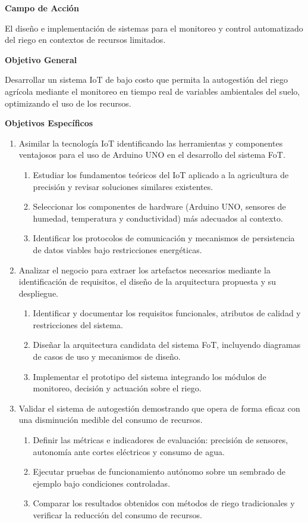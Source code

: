 \bigskip
\noindent\textbf{Campo de Acción}

\noindent El diseño e implementación de sistemas para el monitoreo y control automatizado del riego en contextos de recursos limitados.

\bigskip
\noindent\textbf{Objetivo General}

\noindent Desarrollar un sistema IoT de bajo costo que permita la autogestión del riego agrícola mediante el monitoreo en tiempo real de variables ambientales del suelo, optimizando el uso de los recursos.

\bigskip
\noindent\textbf{Objetivos Específicos}

\begin{enumerate}
	\item Asimilar la tecnología IoT identificando las herramientas y componentes 
	ventajosos para el uso de Arduino UNO en el desarrollo del sistema FoT.
	\begin{enumerate}
		\item Estudiar los fundamentos teóricos del IoT aplicado a la agricultura 
		de precisión y revisar soluciones similares existentes.
		\item Seleccionar los componentes de hardware (Arduino UNO, sensores de 
		humedad, temperatura y conductividad) más adecuados al contexto.
		\item Identificar los protocolos de comunicación y mecanismos de 
		persistencia de datos viables bajo restricciones energéticas.
	\end{enumerate}
	
	\item Analizar el negocio para extraer los artefactos necesarios mediante la 
	identificación de requisitos, el diseño de la arquitectura propuesta y su despliegue.
	\begin{enumerate}
		\item Identificar y documentar los requisitos funcionales, atributos de 
		calidad y restricciones del sistema.
		\item Diseñar la arquitectura candidata del sistema FoT, incluyendo 
		diagramas de casos de uso y mecanismos de diseño.
		\item Implementar el prototipo del sistema integrando los módulos de 
		monitoreo, decisión y actuación sobre el riego.
	\end{enumerate}
	
	\item Validar el sistema de autogestión demostrando que opera de forma eficaz 
	con una disminución medible del consumo de recursos.
	\begin{enumerate}
		\item Definir las métricas e indicadores de evaluación: precisión de 
		sensores, autonomía ante cortes eléctricos y consumo de agua.
		\item Ejecutar pruebas de funcionamiento autónomo sobre un sembrado de 
		ejemplo bajo condiciones controladas.
		\item Comparar los resultados obtenidos con métodos de riego tradicionales 
		y verificar la reducción del consumo de recursos.
	\end{enumerate}
\end{enumerate}


